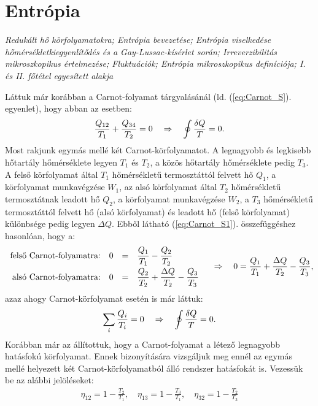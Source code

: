 \section{Entrópia}
\emph{Redukált hő körfolyamatokra; Entrópia bevezetése; Entrópia viselkedése hőmérsékletkiegyenlítődés és a Gay-Lussac-kísérlet során; Irreverzibilitás mikroszkopikus értelmezése; Fluktuációk; Entrópia mikroszkopikus definíciója; I. és II. főtétel egyesített alakja}

Láttuk már korábban a Carnot-folyamat tárgyalásánál (ld. (\ref{eq:Carnot_S}). egyenlet), hogy abban az esetben:
\begin{align}\label{eq:Carnot_S1}
	\frac{Q_{12}}{T_1}+\frac{Q_{34}}{T_2} = 0 \quad\Rightarrow\quad \oint \frac{\delta Q}{T} = 0.
\end{align}
Most rakjunk egymás mellé két Carnot-körfolyamatot. A legnagyobb és legkisebb hőtartály hőmérséklete legyen $T_1$ és $T_2$, a közös hőtartály hőmérséklete pedig $T_3$. A felső körfolyamat által $T_1$ hőmérsékletű termosztáttól felvett hő $Q_1$, a körfolyamat munkavégzése $W_1$, az alsó körfolyamat által $T_2$ hőmérsékletű termosztátnak leadott hő $Q_2$, a körfolyamat munkavégzése $W_2$, a $T_3$ hőmérsékletű termosztáttól felvett hő (alsó körfolyamat) és leadott hő (felső körfolyamat) különbsége pedig legyen $\Delta Q$. Ebből látható (\ref{eq:Carnot_S1}). összefüggéshez hasonlóan, hogy a:
\begin{align}
	\begin{array}{rrcl}
{\tn{felső Carnot-folyamatra:}}&0&=&\dfrac{Q_1}{T_1}-\dfrac{Q_2}{T_2}\vspace{1mm}\\
{\tn{alsó Carnot-folyamatra:}}&0&=&\dfrac{Q_2}{T_2}+\dfrac{\Delta Q}{T_2}-\dfrac{Q_3}{T_3}\\
\end{array}
\follows
0 = \frac{Q_1}{T_1}+\frac{\Delta Q}{T_2}-\frac{Q_3}{T_3},
\end{align} 
azaz ahogy Carnot-körfolyamat esetén is már láttuk:
\begin{align}
	\sum_i \frac{Q_i}{T_i}=0 \quad\Rightarrow\quad \oint\frac{\delta Q}{T} = 0.
\end{align}
Korábban már az állítottuk, hogy a Carnot-folyamat a létező legnagyobb hatásfokú körfolyamat. Ennek bizonyítására vizsgáljuk meg ennél az egymás mellé helyezett két Carnot-körfolyamatból álló rendszer hatásfokát is. Vezessük be az alábbi jelöléseket:
\begin{align}
	\eta_{12}=1-\frac{T_2}{T_1},\quad \eta_{13}=1-\frac{T_3}{T_1},\quad \eta_{32}=1-\frac{T_2}{T_3}
\end{align}
